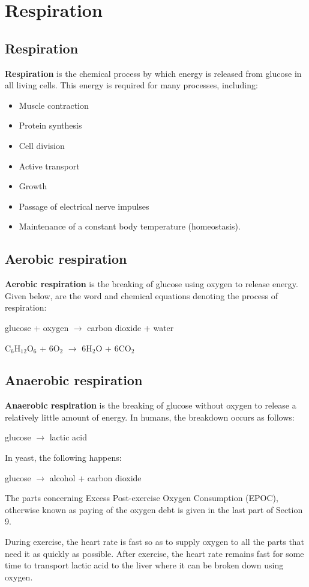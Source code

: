 \section{Respiration}
\subsection{Respiration}
\textbf{Respiration} is the chemical process by which energy is released from glucose in all living
cells. This energy is required for many processes, including:
\begin{itemize}
	\item Muscle contraction
	\item Protein synthesis
	\item Cell division
	\item Active transport
	\item Growth
	\item Passage of electrical nerve impulses
	\item Maintenance of a constant body temperature (homeostasis).
\end{itemize}

\subsection{Aerobic respiration}
\textbf{Aerobic respiration} is the breaking of glucose using oxygen to release energy. 
Given below, are the word and chemical equations denoting the process of respiration:
\begin{center}
	glucose + oxygen $\rightarrow$ carbon dioxide + water

	C$_6$H$_{12}$O$_6$ + 6O$_2$ $\rightarrow$
	6H$_2$O + 6CO$_2$
\end{center}

\subsection{Anaerobic respiration}
\textbf{Anaerobic respiration} is the breaking of glucose without oxygen to release a relatively
little amount of energy. In humans, the breakdown occurs as follows:
\begin{center}
	glucose $\rightarrow$ lactic acid
\end{center}
In yeast, the following happens:
\begin{center}
	glucose $\rightarrow$ alcohol + carbon dioxide
\end{center}
The parts concerning Excess Post-exercise Oxygen Consumption (EPOC), otherwise known as paying of
the oxygen debt is given in the last part of Section 9.

During exercise, the heart rate is fast so as to supply oxygen to all the parts that need it as
quickly as possible. After exercise, the heart rate remains fast for some time to transport lactic
acid to the liver where it can be broken down using oxygen.
